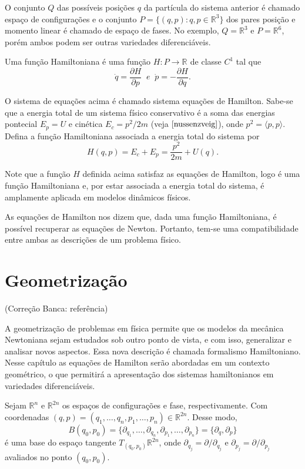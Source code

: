 \documentclass[12pt]{book}
\newcommand{\derivadaparcial}[2]{\frac{\partial #1}{\partial #2}}
\newcommand{\produtointerno}[2]{\langle #1, #2 \rangle}
\newcommand{\real}[1]{\mathbb{R}^{#1}}
\newcommand{\reta}{\real{}}
\newcommand{\alerta}[1]{{\color{red}#1}}
\newcommand{\correcaobanca}[1]{\alerta{(Correção Banca: #1)}}
\begin{document}
	O conjunto $Q$ das possíveis posições $q$ da partícula do sistema anterior é chamado espaço de configurações e o conjunto $P=\{(q,p): q,p\in \real{3}\}$ dos pares posição e momento linear é chamado de espaço de fases. No exemplo, $Q=\real{3}$ e $P = \real{6}$, porém ambos podem ser outras variedades diferenciáveis.
	
	Uma função Hamiltoniana é uma função $H:P \to \reta$ de classe $C^{1}$ tal que 
	$$
	\dot{q} = \derivadaparcial{H}{p} \;\; e \;\; \dot{p} = -\derivadaparcial{H}{q}.
	$$
	
	O sistema de equações acima é chamado sistema equações de Hamilton. Sabe-se que a energia total de um sistema físico conservativo é a soma das energias pontecial $E_{p} = U$ e cinética $E_{c} = p^{2}/2m$ (veja $\cite{nussenzveig}$), onde $p^{2} = \produtointerno{p}{p}$. Defina a função Hamiltoniana associada a energia total do sistema por
	$$
	H(q,p) = E_{c} +E_{p} = \frac{p^{2}}{2m}+U(q). 
	$$
	
	Note que a função $H$ definida acima satisfaz as equações de Hamilton, logo é uma função Hamiltoniana e, por estar associada a energia total do sistema, é amplamente aplicada em modelos dinâmicos físicos.
	
	As equações de Hamilton nos dizem que, dada uma função Hamiltoniana, é possível recuperar as equações de Newton. Portanto, tem-se uma compatibilidade entre ambas as descrições de um problema físico.
	
	\section{Geometrização}
	\correcaobanca{referência}
	
	A geometrização de problemas em física permite que os modelos da mecânica Newtoniana sejam estudados sob outro ponto de vista, e com isso, generalizar e analisar novos aspectos. Essa nova descrição é chamada formalismo Hamiltoniano. Nesse capítulo as equações de Hamilton serão abordadas em um contexto geométrico, o que permitirá a apresentação dos sistemas hamiltonianos em variedades diferenciáveis.
	
	Sejam $\real{n}$ e $\real{2n}$ os espaços de configurações e fase, respectivamente. Com coordenadas $(q, p ) = (q_{1}, \dots ,q_{n}, p_{1}, \dots ,p_{n}) \in \real{2n}$. Desse modo,  
	$$
	B(q_{0}, p_{0})=\{\partial_{q_{1}}, \dots, \partial_{q_{n}}, \partial_{p_{1}}, \dots, \partial_{p_{n}}\}= \{\partial_{q}, \partial_{p}\} $$ 
	é uma base do espaço tangente $T_{(q_{0},p_{0})} \real{2n}$, onde $\partial_{q_{j}} = \partial/\partial_{q_{j}}$ e $\partial_{p_{j}} = \partial/\partial_{p_{j}}$ avaliados no ponto $(q_{0}, p_{0})$. 
	
\end{document}
